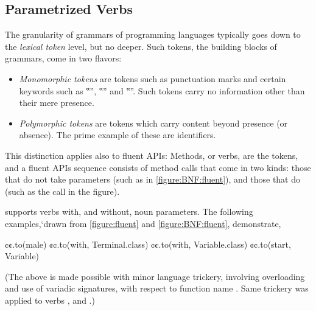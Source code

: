 \subsection{Parametrized Verbs}
The granularity of grammars of programming languages typically goes down to the \emph{lexical token} level,
  but no deeper.
Such tokens, the building blocks of grammars, come in two flavors:
\begin{itemize}
  \item \emph{Monomorphic tokens} are tokens such as punctuation marks and
    certain keywords such as ‟”, ‟” and ‟”.
    Such tokens carry no information other than their mere presence.
  \item \emph{Polymorphic tokens} are tokens which carry content beyond
    presence (or absence). The prime example of these are identifiers.
\end{itemize}

This distinction applies also to fluent APIs: Methods, or verbs, are the
tokens, and a fluent APIs sequence consists of method calls that come in two
kinds: those that do not take parameters (such as  in
\cref{figure:BNF:fluent}), and those that do (such as the call
 in the figure).

\Self supports verbs with, and without, noun parameters.
The following examples,`drawn from \cref{figure:fluent} and \cref{figure:BNF:fluent},
  demonstrate,
\begin{JAVA}
  ¢¢.to(male)
  ¢¢.to(with, Terminal.class)
  ¢¢.to(with, Variable.class)
  ¢¢.to(start, Variable)\end{JAVA}
(The above is made possible with minor \Java language trickery,
  involving overloading and use of variadic signatures,
  with respect to function name .
Same trickery was applied to verbs , and .)

